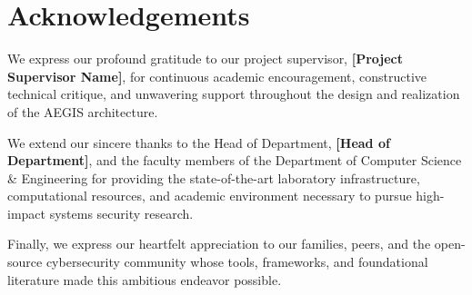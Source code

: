 \vspace{1.0cm}

\section*{Acknowledgements}

We express our profound gratitude to our project supervisor, \textbf{[Project Supervisor Name]}, for continuous academic encouragement, constructive technical critique, and unwavering support throughout the design and realization of the AEGIS architecture.

We extend our sincere thanks to the Head of Department, \textbf{[Head of Department]}, and the faculty members of the Department of Computer Science \& Engineering for providing the state-of-the-art laboratory infrastructure, computational resources, and academic environment necessary to pursue high-impact systems security research.

Finally, we express our heartfelt appreciation to our families, peers, and the open-source cybersecurity community whose tools, frameworks, and foundational literature made this ambitious endeavor possible.

\newpage
